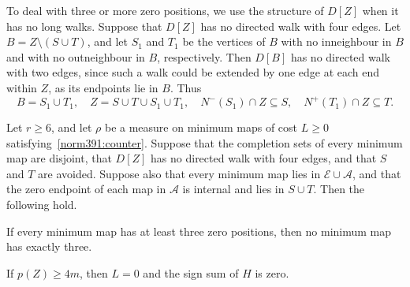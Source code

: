 To deal with three or more zero positions, we use the structure of $D[Z]$ when it has no long walks. Suppose that $D[Z]$ has no directed walk with four edges. Let
$B=Z\setminus(S\cup T)$, and let $S_1$ and $T_1$ be the vertices of
$B$ with no inneighbour in $B$ and with no outneighbour in $B$, respectively.
Then $D[B]$ has no directed walk with two edges, since such a walk could be extended by one edge at each end within $Z$, as its endpoints lie in $B$.
Thus
\begin{equation}\label{norm391:four-cover}
 B=S_1\cup T_1,\quad Z=S\cup T\cup S_1\cup T_1,
 \quad N^-(S_1)\cap Z\subseteq S,
 \quad N^+(T_1)\cap Z\subseteq T.
\end{equation}

\begin{lemma}
\label{norm394:zero-strip}\label{norm394:zero-strip:rest}\label{norm398:threezero-exclusion}
Let $r\ge6$, and let $\rho$ be a measure on minimum maps of cost $L\ge0$ satisfying~\eqref{norm391:counter}. Suppose that the completion sets of every minimum map are disjoint, that $D[Z]$ has no directed walk with four edges, and that $S$ and $T$ are avoided. Suppose also that every minimum map lies in $\mathcal E\cup\mathcal A$, and that the zero endpoint of each map in $\mathcal A$ is internal and lies in $S\cup T$. Then the following hold.
\begin{props}
\item\label{zerostrip:three} If every minimum map has at least three zero positions, then no minimum map has exactly three.
\item\label{zerostrip:four} If $p(Z)\ge4m$, then $L=0$ and the sign sum of $H$ is zero.
\end{props}
\end{lemma}
